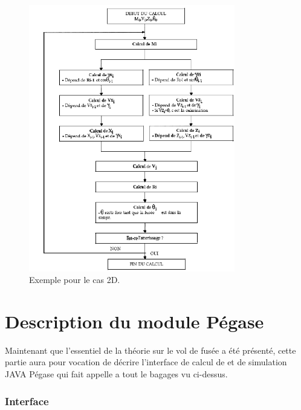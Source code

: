 \documentclass[a4paper]{article}
\begin{document}
\begin{figure}[!htbp]
\begin{center}
\includegraphics[width=9cm]{schema.PNG} 
\end{center}
\caption{Exemple pour le cas 2D.}
\label{scheme}
\end{figure}



\newpage

\part{Description du module Pégase}

Maintenant que l'essentiel de la théorie sur le vol de fusée a été présenté, cette partie aura pour vocation de décrire l'interface de calcul de et de simulation JAVA Pégase qui fait appelle a tout le bagages vu ci-dessus.\\



\section{Interface}
\end{document}

